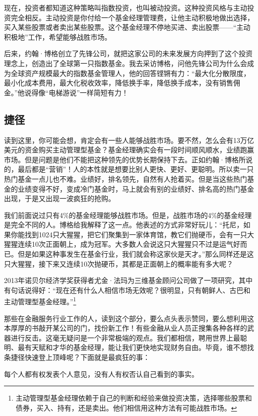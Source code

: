 现在，投资者都知道这种策略叫指数投资，也叫被动投资。这种投资风格与主动投资完全相反。主动投资是你付给一个基金经理管理费，让他主动积极地做出选择，买入某些股票或者卖出某些股票。这个基金经理不停地买进、卖出股票——“主动积极地”工作，希望能够战胜市场。

后来，约翰·博格创立了先锋公司，就把这家公司的未来发展方向押到了这个投资理念上，创造出了全球第一只指数基金。我去采访博格，问他先锋公司为什么会成为全球资产规模最大的指数基金管理人，他的回答铿锵有力：“最大化分散限度，最小化成本费用，最大化税收效率，降低换手率，降低换手成本，没有销售佣金。”他说得像“电梯游说”一样简短有力！

\subsection{捷径}

读到这里，你可能会想，肯定会有一些人能够战胜市场。要不然，怎么会有13万亿美元的资金购买主动管理型基金？基金经理确实会有一段时间顺风顺水，业绩跑赢市场。但是问题是他们不能把这种领先的优势长期保持下去。正如约翰·博格所说的，最后都是“营销”！人的本性就是想要比别人更快、更好、更聪明。所以卖一只热门基金一点儿也不难。业绩好，排名领先，自然有人抢着买。但是当这些热门基金的业绩变得不好，变成冷门基金时，马上就会有别的业绩好、排名高的热门基金出现，于是又出现一波疯狂的抢购。

我们前面说过只有4\%的基金经理能够战胜市场。但是，战胜市场的4\%的基金经理是完全不同的人。博格给我解释了这一点。他表述的方式非常好玩儿：“托尼，如果你能找到1024只大猩猩，把它们聚集到一家体育馆，教它们抛硬币，会有一只大猩猩连续10次正面朝上，成为冠军。大多数人会说这只大猩猩只不过是运气好而已。但是如果这种事发生在基金行业，我们就会称这家伙是天才。”那么同样还是这只大猩猩，接下来又连续10次抛硬币，其都是正面朝上的概率能有多大呢？

2013年诺贝尔经济学奖获得者尤金·法玛为三维基金顾问公司做了一项研究，其中有句话说得好：“现在还有什么人相信市场无效呢？很明显，只有朝鲜人、古巴和主动管理型基金经理。”\footnote{\label{fn:pdf-6-1}主动管理型基金经理依赖于自己的判断和经验来做投资决策，选择哪些股票和债券，买入、持有，还是卖出。他们相信用这种方法有可能战胜市场。}

那些在金融服务行业工作的人，读到这个部分，要么点头表示赞同，要么想利用这本厚厚的书敲开某公司的门，找份新工作！有些金融从业人员正搜集各种各样的武器进行反击。这毫无疑问是一个非常极端的观点。我们都相信，聘用世界上最聪明、最有天赋和才华的基金经理，能让我们更快地实现财务自由。毕竟，谁不想找条捷径快速登上顶峰呢？下面就是最疯狂的事：

每个人都有权发表个人意见，没有人有权否认自己看到的事实。

